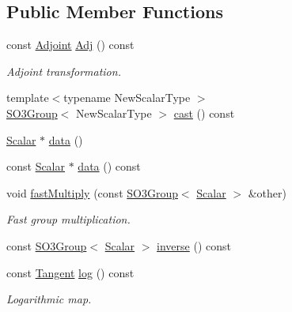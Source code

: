 \subsection*{Public Member Functions}
\begin{DoxyCompactItemize}
\item 
const \hyperlink{class_sophus_1_1_s_o3_group_base_a51c46f75563c21fbd223b4a444923306}{Adjoint} \hyperlink{class_sophus_1_1_s_o3_group_base_a938f2e50857b65bac1babcee269b9d86}{Adj} () const 
\begin{DoxyCompactList}\small\item\em Adjoint transformation. \end{DoxyCompactList}\item 
{\footnotesize template$<$typename New\+Scalar\+Type $>$ }\\\hyperlink{class_sophus_1_1_s_o3_group}{S\+O3\+Group}$<$ New\+Scalar\+Type $>$ \hyperlink{class_sophus_1_1_s_o3_group_base_a2be02c8110c6d160603be88a88336d52}{cast} () const 
\item 
\hyperlink{class_sophus_1_1_s_o3_group_base_a31bf31815c195b7150da8a8e8c6f0189}{Scalar} $\ast$ \hyperlink{class_sophus_1_1_s_o3_group_base_a2fbf1faa2799543e1f42df71bafe3b80}{data} ()
\item 
const \hyperlink{class_sophus_1_1_s_o3_group_base_a31bf31815c195b7150da8a8e8c6f0189}{Scalar} $\ast$ \hyperlink{class_sophus_1_1_s_o3_group_base_afe2f2724f7df77160f63161c20a245f1}{data} () const 
\item 
void \hyperlink{class_sophus_1_1_s_o3_group_base_aa0ed45f31d37bb97c60c839f680bed44}{fast\+Multiply} (const \hyperlink{class_sophus_1_1_s_o3_group}{S\+O3\+Group}$<$ \hyperlink{class_sophus_1_1_s_o3_group_base_a31bf31815c195b7150da8a8e8c6f0189}{Scalar} $>$ \&other)
\begin{DoxyCompactList}\small\item\em Fast group multiplication. \end{DoxyCompactList}\item 
const \hyperlink{class_sophus_1_1_s_o3_group}{S\+O3\+Group}$<$ \hyperlink{class_sophus_1_1_s_o3_group_base_a31bf31815c195b7150da8a8e8c6f0189}{Scalar} $>$ \hyperlink{class_sophus_1_1_s_o3_group_base_a8b22195a0b01980b2656ed838c39cee9}{inverse} () const 
\item 
const \hyperlink{class_sophus_1_1_s_o3_group_base_a11150229b6a471ae96cde974ece5ec7c}{Tangent} \hyperlink{class_sophus_1_1_s_o3_group_base_ae4196d42fc37f6dddb987bfb726575a5}{log} () const 
\begin{DoxyCompactList}\small\item\em Logarithmic map. \end{DoxyCompactList}\item 

\end{DoxyCompactItemize}
